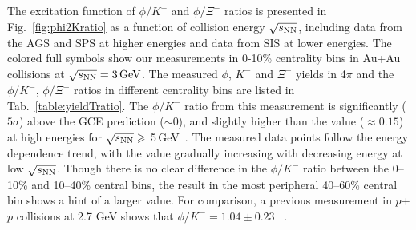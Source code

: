 \documentclass[%
 reprint,	
showpacs,
 amsmath,amssymb,
 aps,
 prc,
]{revtex4-1}
\begin{document}
The excitation function of $\phi/K^-$ and $\phi/\Xi^-$ ratios is presented in Fig.~\ref{fig:phi2Kratio} as a function of collision energy $\sqrt{s_{\rm NN}}$, including data from the AGS and SPS at higher energies and data from SIS at lower energies. The colored full symbols show our measurements in 0-10\% centrality bins in Au+Au collisions at ${\sqrt{s_{\rm NN}} = \rm{3\,GeV}}$. The measured $\phi$, $K^-$ and $\Xi^-$ yields in 4$\pi$ and the $\phi/K^-$, $\phi/\Xi^-$ ratios in different centrality bins are listed in Tab.~\ref{table:yieldTratio}. The $\phi/K^-$ ratio from this measurement is significantly ($5\sigma$) above the GCE prediction ($\sim$0), and slightly higher than the value ($\approx0.15$) at high energies for $\sqrt{s_{\rm NN}}\geqslant$ 5\,GeV~\cite{NA49_phi,NA49_piK,NA49_piK2,E917_phi,ALICE_phi_2p7TeV,STAR_phi_64a200GeV}. The measured data points follow the energy dependence trend, with the value gradually increasing with decreasing energy at low $\sqrt{s_{\rm NN}}$. %
Though there is no clear difference in the $\phi/K^-$ ratio between the 0--10\% and 10--40\% central bins, the result in the most peripheral 40--60\% central bin shows a hint of a larger value. For comparison, a previous measurement in $p$+$p$ collisions at 2.7 GeV shows that $\phi/K^- = 1.04\pm0.23$ ~\cite{ANKE_phi}. 
\end{document}
